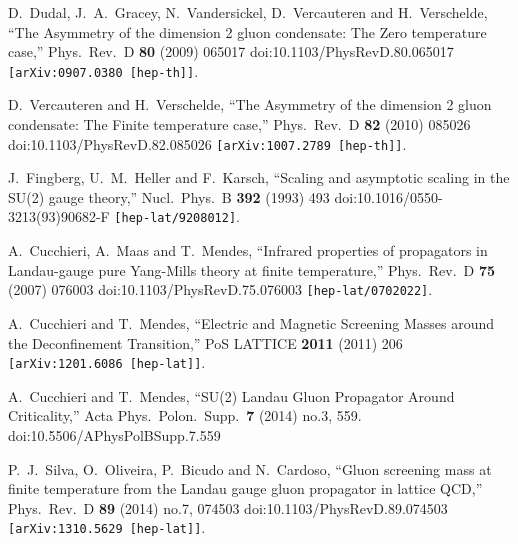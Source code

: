 \documentclass[a4paper,11pt,british,twosides]{book}%
\numberwithin{equation}{section}
\begin{document}
\begin{thebibliography}{9}
  D.~Dudal, J.~A.~Gracey, N.~Vandersickel, D.~Vercauteren and H.~Verschelde,
  ``The Asymmetry of the dimension 2 gluon condensate: The Zero temperature case,''
  Phys.\ Rev.\ D {\bf 80} (2009) 065017
  doi:10.1103/PhysRevD.80.065017
  {\tt [arXiv:0907.0380 [hep-th]]}.



  D.~Vercauteren and H.~Verschelde,
  ``The Asymmetry of the dimension 2 gluon condensate: The Finite temperature case,''
  Phys.\ Rev.\ D {\bf 82} (2010) 085026
  doi:10.1103/PhysRevD.82.085026
  {\tt [arXiv:1007.2789 [hep-th]]}.

  J.~Fingberg, U.~M.~Heller and F.~Karsch,
  ``Scaling and asymptotic scaling in the SU(2) gauge theory,''
  Nucl.\ Phys.\ B {\bf 392} (1993) 493
  doi:10.1016/0550-3213(93)90682-F
  {\tt [hep-lat/9208012]}.

  A.~Cucchieri, A.~Maas and T.~Mendes,
  ``Infrared properties of propagators in Landau-gauge pure Yang-Mills theory at finite
  temperature,''
  Phys.\ Rev.\ D {\bf 75} (2007) 076003
  doi:10.1103/PhysRevD.75.076003
  {\tt [hep-lat/0702022]}.

  A.~Cucchieri and T.~Mendes,
  ``Electric and Magnetic Screening Masses around the Deconfinement Transition,''
  PoS LATTICE {\bf 2011} (2011) 206
  {\tt [arXiv:1201.6086 [hep-lat]]}.

  A.~Cucchieri and T.~Mendes,
  ``SU(2) Landau Gluon Propagator Around Criticality,''
  Acta Phys.\ Polon.\ Supp.\  {\bf 7} (2014) no.3,  559.
  doi:10.5506/APhysPolBSupp.7.559

  P.~J.~Silva, O.~Oliveira, P.~Bicudo and N.~Cardoso,
  ``Gluon screening mass at finite temperature from the Landau gauge gluon propagator in
  lattice QCD,''
  Phys.\ Rev.\ D {\bf 89} (2014) no.7,  074503
  doi:10.1103/PhysRevD.89.074503
  {\tt [arXiv:1310.5629 [hep-lat]]}.


\end{thebibliography}
\end{document}

